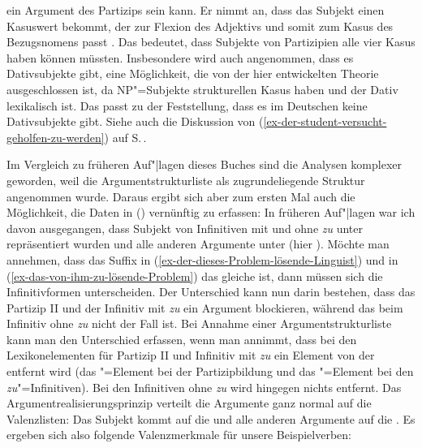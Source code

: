 {ein Argument des Partizips sein kann. Er nimmt an, dass das Subjekt einen Kasuswert bekommt, der zur 
Flexion des Adjektivs und somit zum Kasus des Bezugsnomens passt \citep[]{Jacobs91a}. %
Das bedeutet, dass Subjekte von Partizipien alle vier Kasus haben können müssten. Insbesondere wird auch angenommen, dass es
Dativsubjekte gibt, eine Möglichkeit, die von der hier entwickelten Theorie ausgeschlossen ist, da
NP"=Subjekte strukturellen Kasus haben und der Dativ lexikalisch ist. Das passt zu der Feststellung,
dass es im Deutschen keine Dativsubjekte gibt. Siehe auch die Diskussion von
(\ref{ex-der-student-versucht-geholfen-zu-werden}) auf
S.\,\pageref{ex-der-student-versucht-geholfen-zu-werden}.

Im Vergleich zu früheren Auf"|lagen dieses Buches sind die Analysen komplexer geworden, weil die
Argumentstrukturliste als zugrundeliegende Struktur angenommen wurde. Daraus ergibt sich aber zum
ersten Mal auch die Möglichkeit, die Daten in () vernünftig zu erfassen:
\eal
{}
\zl
In früheren Auf"|lagen war ich davon ausgegangen, dass Subjekt von Infinitiven mit und ohne
\emph{zu} unter \subj repräsentiert wurden und alle anderen Argumente unter \subcat (hier
\comps). Möchte man annehmen, dass das Suffix  in
(\ref{ex-der-dieses-Problem-lösende-Linguist}) und in (\ref{ex-das-von-ihm-zu-lösende-Problem}) das
gleiche ist, dann müssen sich die Infinitivformen unterscheiden. Der Unterschied kann nun darin
bestehen, dass das Partizip II und der Infinitiv mit \emph{zu} ein Argument blockieren, während das
beim Infinitiv ohne \emph{zu} nicht der Fall ist. Bei Annahme einer Argumentstrukturliste kann man
den Unterschied erfassen, wenn man annimmt, dass bei den Lexikonelementen für Partizip II und
Infinitiv mit \emph{zu} ein Element von der \argstl entfernt wird (das \da"=Element bei der
Partizipbildung und das \subj"=Element bei den \emph{zu}"=Infinitiven). Bei den Infinitiven ohne
\emph{zu} wird hingegen nichts entfernt. Das Argumentrealisierungsprinzip verteilt die Argumente
ganz normal auf die Valenzlisten: Das Subjekt kommt auf die \subjl und alle anderen Argumente auf
die \compsl. Es ergeben sich also folgende Valenzmerkmale für unsere Beispielverben:
\largerpage[-2]
\ea
\label{ex-Infinitive-ohne-zu}%
\begin{tabular}[t]{@{}l@{~}l@{~~}l@{~~~}l@{~~~}l@{}}

\end{tabular}}
